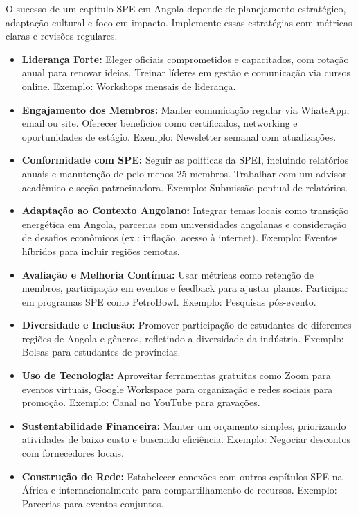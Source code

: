 \documentclass[12pt]{article}
\begin{document}
O sucesso de um capítulo SPE em Angola depende de planejamento estratégico, adaptação cultural e foco em impacto. Implemente essas estratégias com métricas claras e revisões regulares.

\begin{itemize}
    \item \textbf{Liderança Forte:} Eleger oficiais comprometidos e capacitados, com rotação anual para renovar ideias. Treinar líderes em gestão e comunicação via cursos online. Exemplo: Workshops mensais de liderança.
    \item \textbf{Engajamento dos Membros:} Manter comunicação regular via WhatsApp, email ou site. Oferecer benefícios como certificados, networking e oportunidades de estágio. Exemplo: Newsletter semanal com atualizações.
    \item \textbf{Conformidade com SPE:} Seguir as políticas da SPEI, incluindo relatórios anuais e manutenção de pelo menos 25 membros. Trabalhar com um advisor acadêmico e seção patrocinadora. Exemplo: Submissão pontual de relatórios.
    \item \textbf{Adaptação ao Contexto Angolano:} Integrar temas locais como transição energética em Angola, parcerias com universidades angolanas e consideração de desafios econômicos (ex.: inflação, acesso à internet). Exemplo: Eventos híbridos para incluir regiões remotas.
    \item \textbf{Avaliação e Melhoria Contínua:} Usar métricas como retenção de membros, participação em eventos e feedback para ajustar planos. Participar em programas SPE como PetroBowl. Exemplo: Pesquisas pós-evento.
    \item \textbf{Diversidade e Inclusão:} Promover participação de estudantes de diferentes regiões de Angola e gêneros, refletindo a diversidade da indústria. Exemplo: Bolsas para estudantes de províncias.
    \item \textbf{Uso de Tecnologia:} Aproveitar ferramentas gratuitas como Zoom para eventos virtuais, Google Workspace para organização e redes sociais para promoção. Exemplo: Canal no YouTube para gravações.
    \item \textbf{Sustentabilidade Financeira:} Manter um orçamento simples, priorizando atividades de baixo custo e buscando eficiência. Exemplo: Negociar descontos com fornecedores locais.
    \item \textbf{Construção de Rede:} Estabelecer conexões com outros capítulos SPE na África e internacionalmente para compartilhamento de recursos. Exemplo: Parcerias para eventos conjuntos.

\end{itemize}
\end{document}
